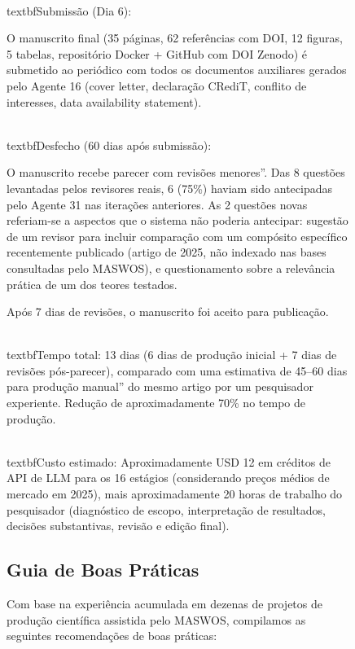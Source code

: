 \begin{figure}
\\textbf{Submissão (Dia 6):}

O manuscrito final (35 páginas, 62 referências com DOI, 12
figuras, 5 tabelas, repositório Docker + GitHub com DOI Zenodo) é
submetido ao periódico com todos os documentos auxiliares gerados
pelo Agente 16 (cover letter, declaração CRediT, conflito de
interesses, data availability statement).

\\textbf{Desfecho (60 dias após submissão):}

O manuscrito recebe parecer com revisões menores''. Das 8
questões levantadas pelos revisores reais, 6 (75\%) haviam sido
antecipadas pelo Agente 31 nas iterações anteriores. As 2
questões novas referiam-se a aspectos que o sistema não poderia
antecipar: sugestão de um revisor para incluir comparação com um
compósito específico recentemente publicado (artigo de 2025, não
indexado nas bases consultadas pelo MASWOS), e questionamento
sobre a relevância prática de um dos teores testados.

Após 7 dias de revisões, o manuscrito foi aceito para publicação.

\\textbf{Tempo total:} 13 dias (6 dias de produção inicial
+ 7 dias de revisões pós-parecer), comparado com uma estimativa
de 45--60 dias para produção manual'' do mesmo artigo por um
pesquisador experiente. Redução de aproximadamente 70\% no
tempo de produção.

\\textbf{Custo estimado:} Aproximadamente USD 12 em
créditos de API de LLM para os 16 estágios (considerando
preços médios de mercado em 2025), mais aproximadamente 20 horas
de trabalho do pesquisador (diagnóstico de escopo, interpretação
de resultados, decisões substantivas, revisão e edição final).


\subsection{Guia de Boas Práticas}
\label{sec:boas_praticas}

Com base na experiência acumulada em dezenas de projetos de
produção científica assistida pelo MASWOS, compilamos as
seguintes recomendações de boas práticas:


\end{figure}
